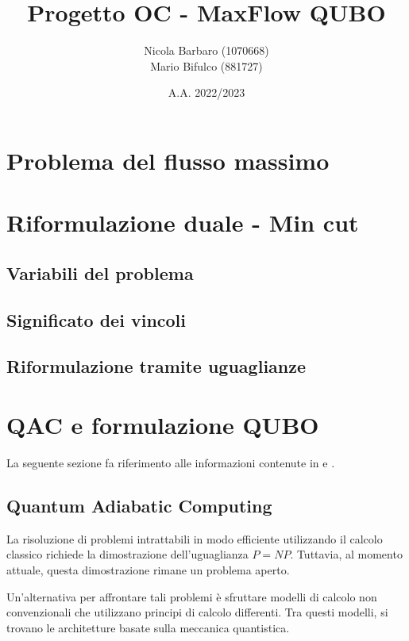 \documentclass{article}
\author{Nicola Barbaro (1070668)\\Mario Bifulco (881727)}
\title{Progetto OC - MaxFlow QUBO}
\date{A.A. 2022/2023}
\begin{document}
\maketitle
\tableofcontents

\section{Problema del flusso massimo}
\section{Riformulazione duale - Min cut}
\subsection{Variabili del problema}
\subsection{Significato dei vincoli}
\subsection{Riformulazione tramite uguaglianze}

\section{QAC e formulazione QUBO}
La seguente sezione fa riferimento alle informazioni contenute in \cite{MCGEOCH2020169} e \cite{DBLP:journals/corr/abs-1811-11538}.

\subsection{Quantum Adiabatic Computing}
La risoluzione di problemi intrattabili in modo efficiente utilizzando il calcolo classico richiede la dimostrazione dell'uguaglianza $P = NP$. Tuttavia, al momento attuale, questa dimostrazione rimane un problema aperto.

Un'alternativa per affrontare tali problemi è sfruttare modelli di calcolo non convenzionali che utilizzano principi di calcolo differenti. Tra questi modelli, si trovano le architetture basate sulla meccanica quantistica.
\end{document}
